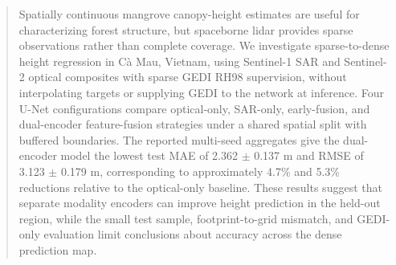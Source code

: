 \begin{abstract}
Spatially continuous mangrove canopy-height estimates are useful for characterizing forest structure, but spaceborne lidar provides sparse observations rather than complete coverage. We investigate sparse-to-dense height regression in Cà Mau, Vietnam, using Sentinel-1 SAR and Sentinel-2 optical composites with sparse GEDI RH98 supervision, without interpolating targets or supplying GEDI to the network at inference. Four U-Net configurations compare optical-only, SAR-only, early-fusion, and dual-encoder feature-fusion strategies under a shared spatial split with buffered boundaries. The reported multi-seed aggregates give the dual-encoder model the lowest test MAE of 2.362 $\pm$ 0.137 m and RMSE of 3.123 $\pm$ 0.179 m, corresponding to approximately 4.7\% and 5.3\% reductions relative to the optical-only baseline. These results suggest that separate modality encoders can improve height prediction in the held-out region, while the small test sample, footprint-to-grid mismatch, and GEDI-only evaluation limit conclusions about accuracy across the dense prediction map.
\end{abstract}

